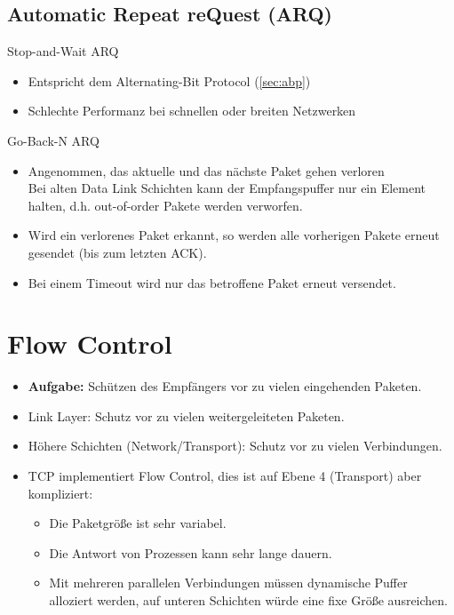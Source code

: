         \subsection{Automatic Repeat reQuest (ARQ)}
            \begin{description}[leftmargin = 2cm]
            	\item[ARQ Typ 1] Stop-and-Wait ARQ
                	\begin{itemize}
                		\item Entspricht dem Alternating-Bit Protocol (\ref{sec:abp})
                		\item Schlechte Performanz bei schnellen oder breiten Netzwerken
                	\end{itemize}
            	\item[ARQ Typ 2] Go-Back-N ARQ
                	\begin{itemize}
                		\item Angenommen, das aktuelle und das nächste Paket gehen verloren \\ Bei alten Data Link Schichten kann der Empfangspuffer nur ein Element halten, d.h. out-of-order Pakete werden verworfen.
                		\item Wird ein verlorenes Paket erkannt, so werden alle vorherigen Pakete erneut gesendet (bis zum letzten ACK).
                		\item Bei einem Timeout wird nur das betroffene Paket erneut versendet.
                	\end{itemize}
            \end{description}

    \section{Flow Control}
        \begin{itemize}
        	\item \textbf{Aufgabe:} Schützen des Empfängers vor zu vielen eingehenden Paketen.
        	\item Link Layer: Schutz vor zu vielen weitergeleiteten Paketen.
        	\item Höhere Schichten (Network/Transport): Schutz vor zu vielen Verbindungen.
        	\item TCP implementiert Flow Control, dies ist auf Ebene 4 (Transport) aber kompliziert:
            	\begin{itemize}
            		\item Die Paketgröße ist sehr variabel.
            		\item Die Antwort von Prozessen kann sehr lange dauern.
            		\item Mit mehreren parallelen Verbindungen müssen dynamische Puffer alloziert werden, auf unteren Schichten würde eine fixe Größe ausreichen.
            	\end{itemize}
        \end{itemize}

